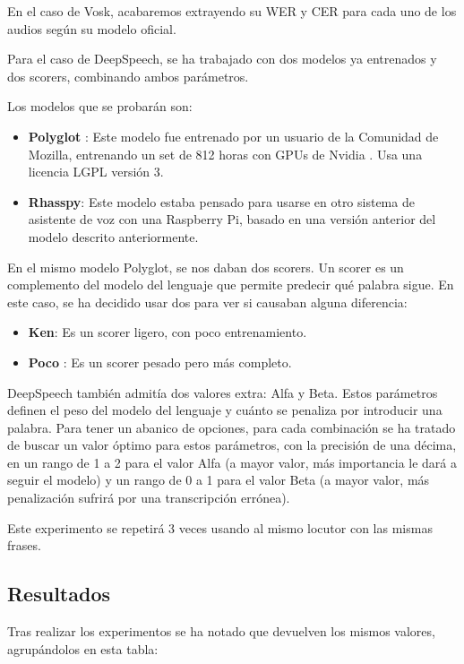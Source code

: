 En el caso de Vosk, acabaremos extrayendo su WER y CER para cada uno de los audios según su modelo oficial.

Para el caso de DeepSpeech, se ha trabajado con dos modelos ya entrenados y dos scorers, combinando ambos parámetros.

Los modelos que se probarán son:
\begin{itemize}
	\item \textbf{Polyglot} \cite{scribosermo}: Este modelo fue entrenado por un usuario de la Comunidad de Mozilla, entrenando un set de 812 horas con GPUs de Nvidia \cite{scribosermo}. Usa una licencia LGPL versión 3.
	\item \textbf{Rhasspy}: Este modelo estaba pensado para usarse en otro sistema de asistente de voz con una Raspberry Pi, basado en una versión anterior del modelo descrito anteriormente.
\end{itemize}

En el mismo modelo Polyglot, se nos daban dos scorers. Un scorer es un complemento del modelo del lenguaje que permite predecir qué palabra sigue. En este caso, se ha decidido usar dos para ver si causaban alguna diferencia:

\begin{itemize}
	\item \textbf{Ken}: Es un scorer ligero, con poco entrenamiento.
	\item \textbf{Poco} : Es un scorer pesado pero más completo.
\end{itemize} 

DeepSpeech también admitía dos valores extra: Alfa y Beta. Estos parámetros definen el peso del modelo del lenguaje y cuánto se penaliza por introducir una palabra. Para tener un abanico de opciones, para cada combinación se ha tratado de buscar un valor óptimo para estos parámetros, con la precisión de una décima, en un rango de 1 a 2 para el valor Alfa (a mayor valor, más importancia le dará a seguir el modelo) y un rango de 0 a 1 para el valor Beta (a mayor valor, más penalización sufrirá por una transcripción errónea).

Este experimento se repetirá 3 veces usando al mismo locutor con las mismas frases.

\subsection{Resultados}

Tras realizar los experimentos se ha notado que devuelven los mismos valores, agrupándolos en esta tabla:

